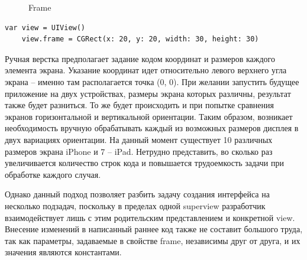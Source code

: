 \begin{figure}[h!]
	\caption{Frame}
	\label{fig:frame}
\end{figure}

\begin{lstlisting}[label=lst:code1, caption=Задание свойства frame для UIView]
	var view = UIView()
	view.frame = CGRect(x: 20, y: 20, width: 30, height: 30)
\end{lstlisting}

Ручная верстка предполагает задание кодом координат и размеров каждого элемента экрана. 
Указание координат идет относительно левого верхнего угла экрана -- именно там располагается точка (0, 0). 
При желании запустить будущее приложение на двух устройствах, размеры экрана которых различны, результат также будет разниться. 
То же будет происходить и при попытке сравнения экранов горизонтальной и вертикальной ориентации. 
Таким образом, возникает необходимость вручную обрабатывать каждый из возможных размеров дисплея в двух вариациях ориентации. 
На данный момент существует 10 различных размеров экрана iPhone и 7 -- iPad. 
Нетрудно представить, во сколько раз увеличивается количество строк кода и повышается трудоемкость задачи при обработке каждого случая. 

Однако данный подход позволяет разбить задачу создания интерфейса на несколько подзадач, поскольку в пределах одной superview разработчик взаимодействует лишь с этим родительским представлением и конкретной view. Внесение изменений в написанный раннее код также не составит большого труда, так как параметры, задаваемые в свойстве frame, независимы друг от друга, и их значения являются константами.


